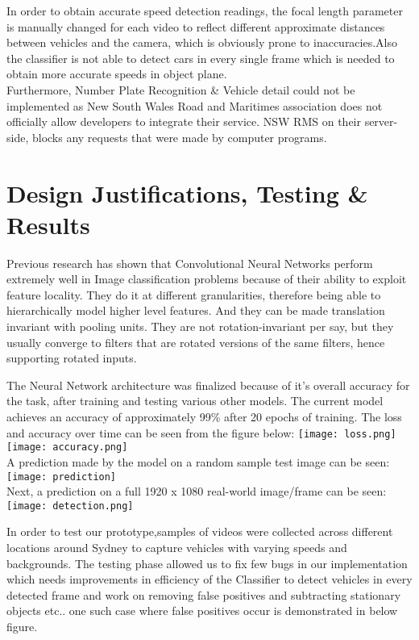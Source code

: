 \documentclass[conference]{IEEEtran}
\begin{document}
In order to obtain accurate speed detection readings, the focal length parameter is manually changed for each video to reflect different approximate distances between vehicles and the camera, which is obviously prone to inaccuracies.Also the classifier is not able to detect cars in every single frame which is needed to obtain more accurate speeds in object plane. \\

Furthermore, Number Plate Recognition \& Vehicle detail could not be implemented as New South Wales Road and Maritimes association does not officially allow developers to integrate their service. NSW RMS on their server-side, blocks any requests that were made by computer programs. \\

\section{Design Justifications, Testing \& Results}
Previous research\cite{b18,b19} has shown that Convolutional Neural Networks perform extremely well in Image classification problems because of their ability to exploit feature locality. They do it at different granularities, therefore being able to hierarchically model higher level features. And they can be made translation invariant with pooling units. They are not rotation-invariant per say, but they usually converge to filters that are rotated versions of the same filters, hence supporting rotated inputs. 

The Neural Network architecture was finalized because of it's overall accuracy for the task, after training and testing various other models. The current model achieves an accuracy of approximately 99\% after 20 epochs of training. The loss and accuracy over time can be seen from the figure below:
\texttt{[image: loss.png]}
\\
\texttt{[image: accuracy.png]} \\
A prediction made by the model on a random sample test image can be seen:\\
\texttt{[image: prediction]} \\
Next, a prediction on a full 1920 x 1080 real-world image/frame can be seen:\\
\texttt{[image: detection.png]} 

In order to test our prototype,samples of videos were collected across different locations around Sydney to capture vehicles with varying speeds and backgrounds. The testing phase allowed us to fix few bugs in our implementation which needs improvements in efficiency of the Classifier to detect vehicles in every detected frame and work on removing false positives and subtracting stationary objects etc.. one such case where false positives occur is demonstrated in below figure. 
\end{document}
